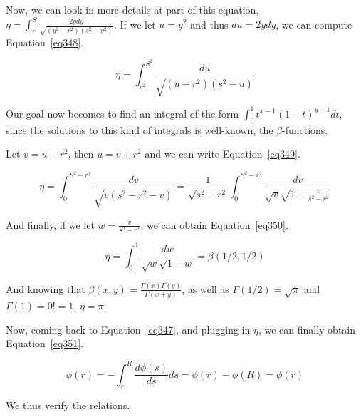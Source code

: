 Now, we can look in more details at part of this equation, $\eta = \int_r^S \frac{2ydy}{\sqrt{(y^2-r^2)(s^2-y^2)}}$. If we let $u=y^2$ and thus $du = 2ydy$, we can compute Equation~\ref{eq348}.

\begin{equation}\label{eq348}
\eta = \int_{r^2}^{S^2} \frac{du}{\sqrt{(u-r^2)(s^2-u)}}
\end{equation}

Our goal now becomes to find an integral of the form $\int_0^1 t^{x-1} (1-t)^{y-1} dt$, since the solutions to this kind of integrals is well-known, the $\beta$-functions.

Let $v = u-r^2$, then $u = v+r^2$ and we can write Equation~\ref{eq349}.


\begin{equation}\label{eq349}
\eta = \int_{0}^{S^2-r^2} \frac{dv}{\sqrt{v(s^2-r^2-v)}} = \frac{1}{\sqrt{s^2 - r^2}} \int_{0}^{S^2-r^2} \frac{dv}{\sqrt{v} \sqrt{1 - \frac{v}{s^2-r^2}}}
\end{equation}

And finally, if we let $w = \frac{v}{s^2-r^2}$, we can obtain Equation~\ref{eq350}.


\begin{equation}\label{eq350}
\eta = \int_{0}^{1} \frac{dw}{\sqrt{w} \sqrt{1-w}} = \beta(1/2, 1/2)
\end{equation}

And knowing that $\beta(x, y) = \frac{\Gamma(x)\Gamma(y)}{\Gamma(x+y)}$, as well as $\Gamma(1/2) = \sqrt{\pi}$ and $\Gamma(1) = 0! = 1$, $\eta = \pi$.

Now, coming back to Equation~\ref{eq347}, and plugging in $\eta$, we can finally obtain Equation~\ref{eq351}.

\begin{equation}\label{eq351}
\phi(r) = - \int_r^R \frac{d\phi(s)}{ds} ds = \phi(r) - \phi(R) = \phi(r)
\end{equation}

We thus verify the relations.
